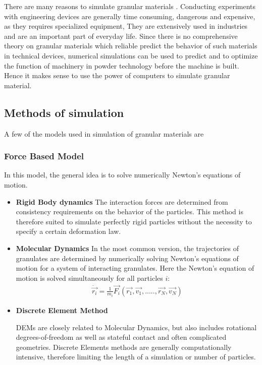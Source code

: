 There are many reasons to simulate granular materials \citep{por}. Conducting experiments with engineering devices are generally time consuming, dangerous and expensive, as they requires specialized equipment, They are extensively used in industries and are an important part of everyday life. Since there is no comprehensive theory on granular materials which reliable predict the behavior of such materials in technical devices, numerical simulations can be used to predict and to optimize the function of machinery in powder technology before the machine is built. Hence it makes sense to use the power of computers to simulate granular material.

\subsection{Methods of simulation}

A few of the models used in simulation of granular materials are

\subsubsection{Force Based Model}

In this model, the general idea is to solve numerically Newton's equations of motion.
\begin{itemize}
\item \textbf{Rigid Body dynamics}
The interaction forces are determined from consistency requirements on the behavior of the particles. This method is therefore suited to simulate perfectly rigid particles without the necessity to specify a certain deformation law.

\item \textbf{Molecular Dynamics}
In the most common version, the trajectories of granulates are determined by numerically solving Newton's equations of motion for a system of interacting granulates. Here the Newton's equation of motion is solved simultaneously for all particles $i$:
\begin{align*}
\ddot{\vec{r_{i}}} = \frac{1}{m_{i}} \vec{F_{i}}(\vec{r_{1}}, \vec{v_{1}},.....,\vec{r_{N}},\vec{v_{N}})
\end{align*}

\item \textbf{Discrete Element Method}

DEMs are closely related to Molecular Dynamics, but also includes rotational degrees-of-freedom as well as stateful contact and often complicated geometries. Discrete Elements methods are generally computationally intensive, therefore limiting the length of a simulation or number of particles.


\end{itemize}

